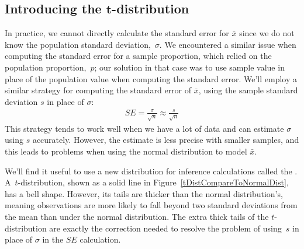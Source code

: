 



\subsection{Introducing the $\mathbf{t}$-distribution}
\label{introducingTheTDistribution}


In practice, we cannot directly calculate the standard error
for $\bar{x}$ since we do not know the population standard
deviation,~$\sigma$.
We encountered a similar issue when computing the standard
error for a sample proportion, which relied on the population
proportion,~$p$;
our solution in that case was to use sample value in place
of the population value when computing the standard error.
We'll employ a similar strategy for computing the standard
error of $\bar{x}$, using the sample
standard deviation $s$ in place of $\sigma$:
\begin{align*}
SE = \frac{\sigma}{\sqrt{n}} \approx \frac{s}{\sqrt{n}}
\end{align*}
This strategy tends to work well when we have
a lot of data and can estimate $\sigma$ using $s$ accurately.
However, the estimate is less precise with smaller samples,
and this leads to problems when using the normal
distribution to model $\bar{x}$.

We'll find it useful to use a new distribution for
inference calculations called the
.
A~$t$-distribution, shown as a solid line in
Figure~\ref{tDistCompareToNormalDist}, has a bell shape.
However, its tails are thicker than the normal distribution's,
meaning observations are more likely to fall beyond two
standard deviations from the mean than under the normal
distribution. %
The extra thick tails of the $t$-distribution are exactly
the correction needed to resolve the problem of using~$s$
in place of $\sigma$ in the $SE$ calculation.

